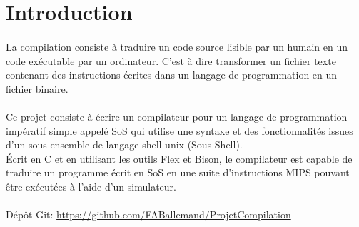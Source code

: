 \section{Introduction}

\paragraph{}
La compilation consiste à traduire un code source lisible par un humain en un code exécutable par un ordinateur. C'est à dire transformer un fichier texte contenant des instructions écrites dans un langage de programmation en un fichier binaire.

\paragraph{}
Ce projet consiste à écrire un compilateur pour un langage de programmation impératif simple appelé SoS qui utilise une syntaxe et des fonctionnalités issues d'un sous-ensemble de langage shell
unix (Sous-Shell).\\
\'Ecrit en C et en utilisant les outils \textsf{Flex} et \textsf{Bison}, le compilateur est capable de traduire un programme écrit en SoS en une suite d'instructions MIPS pouvant être exécutées à l'aide d'un simulateur.

\paragraph{}
Dépôt Git: \url{https://github.com/FABallemand/ProjetCompilation}